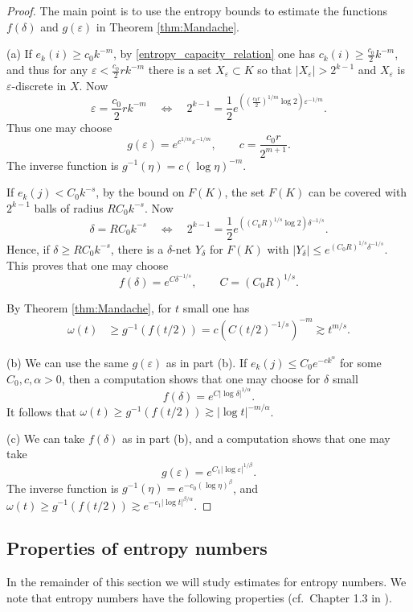 \documentclass[12pt,twoside]{amsart}
\numberwithin{equation}{section}
\renewcommand{\leq}{\leqslant}
\renewcommand{\geq}{\geqslant}
\newcommand{\abs}[1]{\lvert #1 \rvert}          %
\newcommand{\eps}{\varepsilon}
\begin{document}
\begin{proof}
The main point is to use the entropy bounds to estimate the functions $f(\delta)$ and $g(\eps)$ in Theorem \ref{thm:Mandache}.

(a) If $e_k(i) \geq c_0 k^{-m}$, by \eqref{entropy_capacity_relation} one has $c_k(i) \geq \frac{c_0}{2} k^{-m}$, and thus for any $\eps < \frac{c_0}{2} r k^{-m}$ there is a set $X_{\eps} \subset K$ so that $\abs{X_{\eps}} > 2^{k-1}$ and $X_{\eps}$ is $\eps$-discrete in $X$. Now 
\[
\eps = \frac{c_0}{2} r k^{-m} \quad \Longleftrightarrow \quad 2^{k-1} = \frac{1}{2} e^{( (\frac{c_0 r}{2} )^{1/m} \log 2) \eps^{-1/m}}.
\]
Thus one may choose 
\[
g(\eps) = e^{c^{1/m} \eps^{-1/m}}, \qquad c = \frac{c_0 r}{2^{m+1}}.
\]
The inverse function is $g^{-1}(\eta) = c (\log \eta)^{-m}$.

If $e_k(j) < C_0 k^{-s}$, by the bound on $F(K)$, the set $F(K)$ can be covered with $2^{k-1}$ balls of radius $R C_0 k^{-s}$. Now 
\[
\delta = R C_0 k^{-s} \quad \Longleftrightarrow \quad 2^{k-1} = \frac{1}{2} e^{((C_0 R)^{1/s} \log 2) \delta^{-1/s}}.
\]
Hence, if $\delta \geq R C_0 k^{-s}$, there is a $\delta$-net $Y_{\delta}$ for $F(K)$ with $\abs{Y_{\delta}} \leq e^{(C_0 R)^{1/s} \delta^{-1/s}}$. This proves that one may choose 
\[
f(\delta) = e^{C\delta^{-1/s}}, \qquad C = (C_0 R)^{1/s}.
\]

By Theorem \ref{thm:Mandache}, for $t$ small one has 
\begin{align*}
\omega(t) &\geq g^{-1}(f(t/2)) = c (C(t/2)^{-1/s})^{-m}
\gtrsim t^{m/s}.
\end{align*}

(b) We can use the same $g(\eps)$ as in part (b). If $e_k(j) \leq C_0 e^{-ck^{\alpha}}$ for some $C_0, c, \alpha > 0$, then a computation shows that one may choose for $\delta$ small 
\[
f(\delta) = e^{C \abs{\log \delta}^{1/\alpha}}.
\]
It follows that $\omega(t) \geq g^{-1}(f(t/2)) \gtrsim \abs{\log t}^{-m/\alpha}$.

(c) We can take $f(\delta)$ as in part (b), and a computation shows that one may take 
\[
g(\eps) = e^{C_1 \abs{\log \eps}^{1/\beta}}.
\]
The inverse function is $g^{-1}(\eta) = e^{-c_0 (\log \eta)^{\beta}}$, and $\omega(t) \geq g^{-1}(f(t/2)) \gtrsim e^{-c_1 \abs{\log t}^{\beta/\alpha}}$.
\end{proof}




\subsection{Properties of entropy numbers}
In the remainder of this section we will study estimates for entropy numbers. We note that entropy numbers have the following properties (cf.\ Chapter 1.3 in \cite{ET08}).
\end{document}
